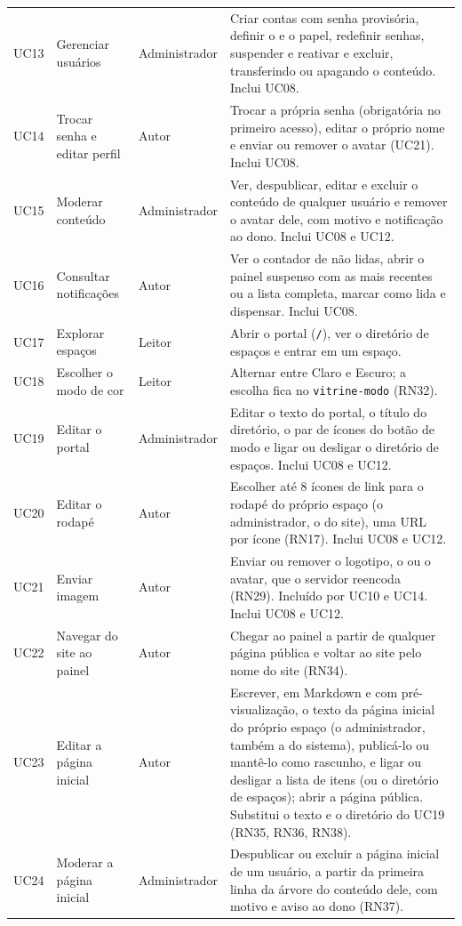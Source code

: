 \begin{longtable}{@{}L{1.2cm}L{4.4cm}L{2.5cm}L{5.0cm}@{}}
UC13 & Gerenciar usuários & Administrador & Criar contas com senha provisória, definir o  e o papel, redefinir senhas, suspender e reativar e excluir, transferindo ou apagando o conteúdo. Inclui UC08.\\
UC14 & Trocar senha e editar perfil & Autor & Trocar a própria senha (obrigatória no primeiro acesso), editar o próprio nome e enviar ou remover o avatar (UC21). Inclui UC08.\\
UC15 & Moderar conteúdo & Administrador & Ver, despublicar, editar e excluir o conteúdo de qualquer usuário e remover o avatar dele, com motivo e notificação ao dono. Inclui UC08 e UC12.\\
UC16 & Consultar notificações & Autor & Ver o contador de não lidas, abrir o painel suspenso com as mais recentes ou a lista completa, marcar como lida e dispensar. Inclui UC08.\\
UC17 & Explorar espaços & Leitor & Abrir o portal (\texttt{/}), ver o diretório de espaços e entrar em um espaço.\\
UC18 & Escolher o modo de cor & Leitor & Alternar entre Claro e Escuro; a escolha fica no  \texttt{vitrine-modo} (RN32).\\
UC19 & Editar o portal & Administrador & Editar o texto do portal, o título do diretório, o par de ícones do botão de modo e ligar ou desligar o diretório de espaços. Inclui UC08 e UC12.\\
UC20 & Editar o rodapé & Autor & Escolher até 8 ícones de link para o rodapé do próprio espaço (o administrador, o do site), uma URL por ícone (RN17). Inclui UC08 e UC12.\\
UC21 & Enviar imagem & Autor & Enviar ou remover o logotipo, o  ou o avatar, que o servidor reencoda (RN29). Incluído por UC10 e UC14. Inclui UC08 e UC12.\\
UC22 & Navegar do site ao painel & Autor & Chegar ao painel a partir de qualquer página pública e voltar ao site pelo nome do site (RN34).\\
UC23 & Editar a página inicial & Autor & Escrever, em Markdown e com pré-visualização, o texto da página inicial do próprio espaço (o administrador, também a do sistema), publicá-lo ou mantê-lo como rascunho, e ligar ou desligar a lista de itens (ou o diretório de espaços); abrir a página pública. Substitui o texto e o diretório do UC19 (RN35, RN36, RN38).\\
UC24 & Moderar a página inicial & Administrador & Despublicar ou excluir a página inicial de um usuário, a partir da primeira linha da árvore do conteúdo dele, com motivo e aviso ao dono (RN37).\\
\end{longtable}

